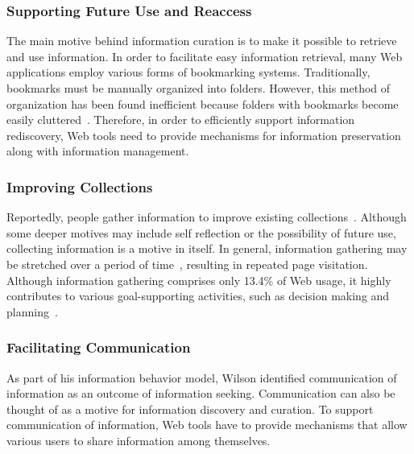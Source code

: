 \documentclass{sigchi}
\begin{document}
{{\subsubsection{Supporting Future Use and Reaccess}
The main motive behind information curation is to make it possible to retrieve and use information. In order to facilitate easy information retrieval, many Web applications employ various forms of bookmarking systems. Traditionally, bookmarks must be manually organized into folders. However, this method of organization has been found inefficient because folders with bookmarks become easily cluttered~\cite{abrams1998information}. Therefore, in order to efficiently support information rediscovery, Web tools need to provide mechanisms for information preservation along with information management.
}

{\subsubsection{Improving Collections}
Reportedly, people gather information to improve existing collections~\cite{lindley2012s}. Although some deeper motives may include self reflection or the possibility of future use, collecting information is a motive in itself. In general, information gathering may be stretched over a period of time~\cite{kellar2006goal}, resulting in repeated page visitation. Although information gathering comprises only 13.4\% of Web usage, it highly contributes to various goal-supporting activities, such as decision making and planning~\cite{kellar2006goal}.

}

{\subsubsection{Facilitating Communication}
As part of his information behavior model, Wilson identified communication of information as an outcome of information seeking. Communication can also be thought of as a motive for information discovery and curation. To support communication of information, Web tools have to provide mechanisms that allow various users to share information among themselves. 

}}
\end{document}
